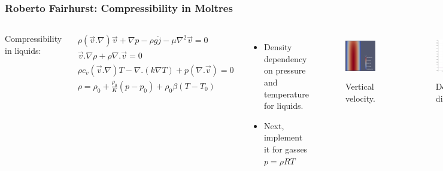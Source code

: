 \begin{frame}
	\frametitle{Roberto Fairhurst: Compressibility in Moltres}
		\begin{columns}
		\column[t]{6cm}

		Compressibility in liquids:
		
            \begin{align}
			\rho (\vec{v}.\nabla)\vec{v} + \nabla p - \rho g \check{j} - \mu \nabla^{2}\vec{v} = 0 \\
			\vec{v}.\nabla\rho+\rho\nabla.\vec{v}=0 \\
			\rho c_{v} (\vec{v}.\nabla)T - \nabla .(k\nabla T) + p (\nabla . \vec{v})= 0 \\
			\rho = \rho_{0} + \frac{\rho_{0}}{K}(p-p_{0}) + \rho_{0}\beta(T-T_{0})
            \end{align}

			\begin{itemize}
				\item Density dependency on pressure and temperature for liquids.
				\item Next, implement it for gasses $p=\rho RT$
			\end{itemize}

		\column[t]{5cm}
		\begin{figure}[htbp!]
			\begin{center}
				\includegraphics[height=2cm]{./images/liquid_compres.png}
			\end{center}
			\caption{Vertical velocity.}
			\label{fig:velocity}
		\end{figure}

		\begin{figure}[htbp!]
			\begin{center}
				\includegraphics[height=2cm]{./images/rho.png}
			\end{center}
			\caption{Density distribution.}
			\label{fig:density}
		\end{figure}

		\end{columns}
\end{frame}